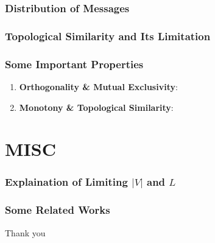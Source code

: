 \documentclass[compress,mathserif,xcolor=dvipsnames,svgnames,aspectratio=43]{beamer}
\begin{document}
\begin{frame}[c]
  \frametitle{Distribution of Messages}
  
\end{frame}

\begin{frame}[c]
  \frametitle{Topological Similarity and Its Limitation}
  
\end{frame}

\begin{frame}[c]
  \frametitle{Some Important Properties}
  \begin{enumerate}
    \item \textbf{Orthogonality \& Mutual Exclusivity}: 
    \item \textbf{Monotony \& Topological Similarity}: 
  \end{enumerate}
\end{frame}


\section{MISC}

\begin{frame}[c]
  \frametitle{Explaination of Limiting $|V|$ and $L$}
  
\end{frame}

\begin{frame}[c]
  \frametitle{Some Related Works}
  \cite{li2019ease}
\end{frame}


\appendix
{}
\setcounter{finalframe}{\value{framenumber}}

\begin{frame} %

\begin{center}
\huge{Thank you}
\end{center}
\end{frame}

\begin{frame}
\tiny{
   
   
}
\end{frame}

\setcounter{framenumber}{\value{finalframe}}
\end{document}
